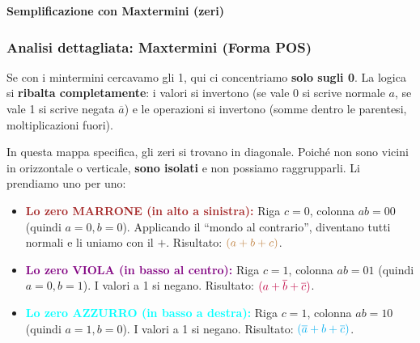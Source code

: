 \documentclass[11pt,a4paper]{report}
\begin{document}
\begin{center}
\textbf{Semplificazione con Maxtermini (zeri)}\\[0.5em]
\end{center}

\subsubsection*{Analisi dettagliata: Maxtermini (Forma POS)}
Se con i mintermini cercavamo gli 1, qui ci concentriamo \textbf{solo sugli 0}. La logica si \textbf{ribalta completamente}: i valori si invertono (se vale 0 si scrive normale $a$, se vale 1 si scrive negata $\overline{a}$) e le operazioni si invertono (somme dentro le parentesi, moltiplicazioni fuori).

In questa mappa specifica, gli zeri si trovano in diagonale. Poiché non sono vicini in orizzontale o verticale, \textbf{sono isolati} e non possiamo raggrupparli. Li prendiamo uno per uno:

\begin{itemize}
    \item \textcolor{brown}{\textbf{Lo zero MARRONE (in alto a sinistra):}} Riga $c=0$, colonna $ab=00$ (quindi $a=0, b=0$). Applicando il ``mondo al contrario'', diventano tutti normali e li uniamo con il $+$. Risultato: $\textcolor{brown}{(a + b + c)}$.
    \item \textcolor{purple}{\textbf{Lo zero VIOLA (in basso al centro):}} Riga $c=1$, colonna $ab=01$ (quindi $a=0, b=1$). I valori a 1 si negano. Risultato: $\textcolor{purple}{(a + \overline{b} + \overline{c})}$.
    \item \textcolor{cyan}{\textbf{Lo zero AZZURRO (in basso a destra):}} Riga $c=1$, colonna $ab=10$ (quindi $a=1, b=0$). I valori a 1 si negano. Risultato: $\textcolor{cyan}{(\overline{a} + b + \overline{c})}$.
\end{itemize}
\end{document}
